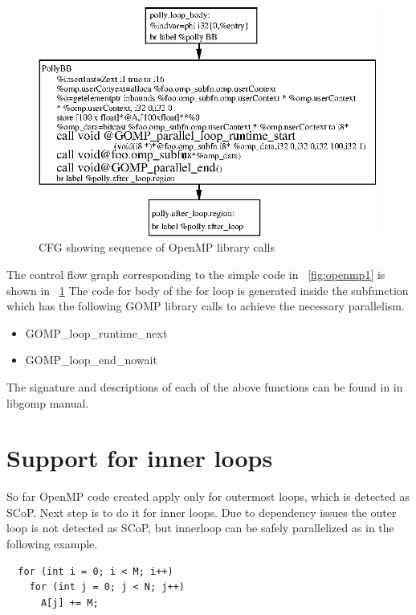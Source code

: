 \begin{figure}
  \label{fig:openmp_cfg}
  \includegraphics[width=1\textwidth]{images/ompcalls.eps}
  \caption{CFG showing sequence of OpenMP library calls}
\end{figure}

The control flow graph corresponding to the simple code in ~\ref{fig:openmp1} is shown in ~\ref{fig:openmp_cfg}
The code for body of the for loop is generated inside the subfunction which has the following GOMP library
calls to achieve the necessary parallelism.

\begin{itemize}
\item GOMP\_loop\_runtime\_next
\item GOMP\_loop\_end\_nowait
\end{itemize}

The signature and descriptions of each of the above functions can be found in in libgomp manual\cite{libgomp}.

\section{Support for inner loops}

So far OpenMP code created apply only for outermost loops, which is detected as SCoP. Next step is to do it for
inner loops. Due to dependency issues the outer loop is not detected as SCoP, but innerloop can be safely
parallelized as in the following example.

\begin{lstlisting}
  for (int i = 0; i < M; i++)
    for (int j = 0; j < N; j++)
      A[j] += M;
\end{lstlisting}

